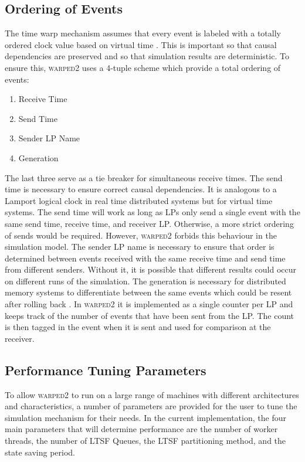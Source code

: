 \documentclass[11pt]{book}
\begin{document}
\subsection{Ordering of Events}

The time warp mechanism assumes that every event is labeled with a totally ordered clock value
based on virtual time \cite{jefferson-85}. This is important so that causal dependencies
are preserved and so that simulation results are deterministic\cite{ronngren-99}. To ensure
this, \textsc{warped2} uses a 4-tuple scheme which provide a total ordering of events:

\begin{enumerate}
    \item Receive Time
    \item Send Time
    \item Sender LP Name
    \item Generation
\end{enumerate}

\noindent %
The last three serve as a tie breaker for simultaneous receive times. The send time is
necessary to ensure correct causal dependencies. It is analogous to a Lamport logical
clock\cite{lamport-78} in real time distributed systems but for virtual time systems. The
send time will work as long as LPs only send a single event with the same send time, receive
time, and receiver LP. Otherwise, a more strict ordering of sends would be required. However,
\textsc{warped2} forbids this behaviour in the simulation model. The sender LP name is necessary
to ensure that order is determined between events received with the same receive time and send
time from different senders. Without it, it is possible that different results could occur on
different runs of the simulation\cite{ronngren-99}. The generation is necessary for distributed
memory systems to differentiate between the same events which could be resent after rolling back
\cite{ronngren-99}. In \textsc{warped2} it is implemented as a single counter per LP and
keeps track of the number of events that have been sent from the LP. The count is then
tagged in the event when it is sent and used for comparison at the receiver.

\subsection{Performance Tuning Parameters}

To allow \textsc{warped2} to run on a large range of machines with different architectures and
characteristics, a number of parameters are provided for the user to tune the simulation mechanism
for their needs. In the current implementation, the four main parameters that will determine
performance are the number of worker threads, the number of LTSF Queues, the LTSF partitioning
method, and the state saving period.
\end{document}
